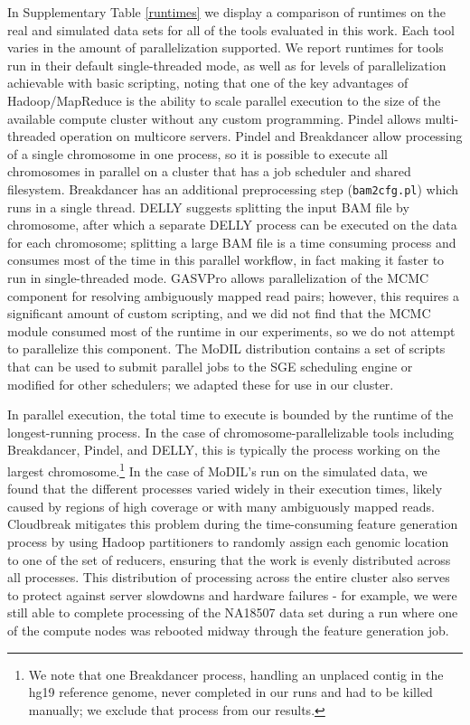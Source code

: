 \documentclass[11pt]{article}
\begin{document}
In Supplementary Table \ref{runtimes} we display a comparison of runtimes on the real and simulated data sets for all of the tools evaluated in this work. Each tool varies in the amount of parallelization supported. We report runtimes for tools run in their default single-threaded mode, as well as for levels of parallelization achievable with basic scripting, noting that one of the key advantages of Hadoop/MapReduce is the ability to scale parallel execution to the size of the available compute cluster without any custom programming. Pindel allows multi-threaded operation on multicore servers. Pindel and Breakdancer allow processing of a single chromosome in one process, so it is possible to execute all chromosomes in parallel on a cluster that has a job scheduler and shared filesystem. Breakdancer has an additional preprocessing step (\texttt{bam2cfg.pl}) which runs in a single thread. DELLY suggests splitting the input BAM file by chromosome, after which a separate DELLY process can be executed on the data for each chromosome; splitting a large BAM file is a time consuming process and consumes most of the time in this parallel workflow, in fact making it faster to run in single-threaded mode. GASVPro allows parallelization of the MCMC component for resolving ambiguously mapped read pairs; however, this requires a significant amount of custom scripting, and we did not find that the MCMC module consumed most of the runtime in our experiments, so we do not attempt to parallelize this component. The MoDIL distribution contains a set of scripts that can be used to submit parallel jobs to the SGE scheduling engine or modified for other schedulers; we adapted these for use in our cluster.

In parallel execution, the total time to execute is bounded by the runtime of the longest-running process. In the case of chromosome-parallelizable tools including Breakdancer, Pindel, and DELLY, this is typically the process working on the largest chromosome.\footnote{We note that one Breakdancer process, handling an unplaced contig in the hg19 reference genome, never completed in our runs and had to be killed manually; we exclude that process from our results.} In the case of MoDIL's run on the simulated data, we found that the different processes varied widely in their execution times, likely caused by regions of high coverage or with many ambiguously mapped reads. Cloudbreak mitigates this problem during the time-consuming feature generation process by using Hadoop partitioners to randomly assign each genomic location to one of the set of reducers, ensuring that the work is evenly distributed across all processes. This distribution of processing across the entire cluster also serves to protect against server slowdowns and hardware failures - for example, we were still able to complete processing of the NA18507 data set during a run where one of the compute nodes was rebooted midway through the feature generation job.
\end{document}
